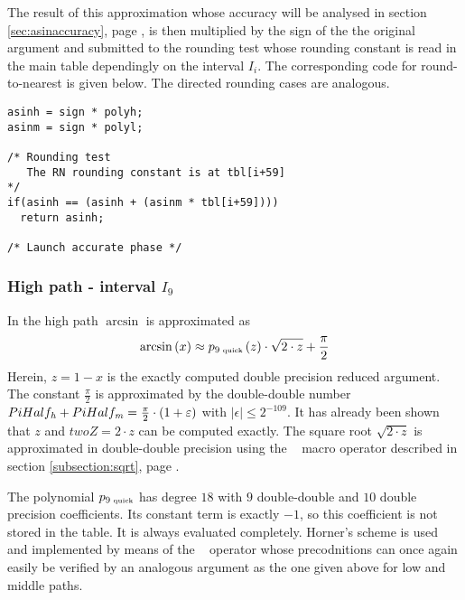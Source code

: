 The result of this approximation whose accuracy will be analysed in
section \ref{sec:asinaccuracy}, page \pageref{sec:asinaccuracy}, is
then multiplied by the sign of the the original argument and submitted
to the rounding test whose rounding constant is read in the main table
dependingly on the interval $I_i$. The corresponding code for
round-to-nearest is given below. The directed rounding cases are
analogous.
\begin{lstlisting}[caption={Middle path quick phase rounding test},firstnumber=1]
asinh = sign * polyh;
asinm = sign * polyl;

/* Rounding test 
   The RN rounding constant is at tbl[i+59]
*/
if(asinh == (asinh + (asinm * tbl[i+59]))) 
  return asinh;

/* Launch accurate phase */
\end{lstlisting} 

\subsubsection{High path - interval $I_9$}
In the high path $\arcsin$ is approximated as 
$$\arcsin\left( x \right) \approx p_{9\mbox{\tiny ~quick}}\left( z \right) \cdot \sqrt{2 \cdot z} + \frac{\pi}{2}$$
Herein, $z = 1 - x$ is the exactly computed double precision reduced
argument. The constant $\frac{\pi}{2}$ is approximated by the
double-double number $PiHalf_{\mathit{h}} + PiHalf_{\mathit{m}} = \frac{\pi}{2} \cdot
\left( 1 + \varepsilon \right)$ with $\left \vert \epsilon \right \vert
\leq 2^{-109}$. It has already been shown that $z$ and $twoZ = 2 \cdot
z$ can be computed exactly. The square root $\sqrt{2 \cdot z}$ is
approximated in double-double precision using the \SqrtD~ macro
operator described in section \ref{subsection:sqrt}, page
\pageref{subsection:sqrt}. 

The polynomial $p_{9\mbox{\tiny ~quick}}$ has degree $18$ with $9$
double-double and $10$ double precision coefficients. Its constant
term is exactly $-1$, so this coefficient is not stored in the table.
It is always evaluated completely. Horner's scheme is used and
implemented by means of the \MulAddDdD~ operator whose precodnitions
can once again easily be verified by an analogous argument as the one
given above for low and middle paths. 

